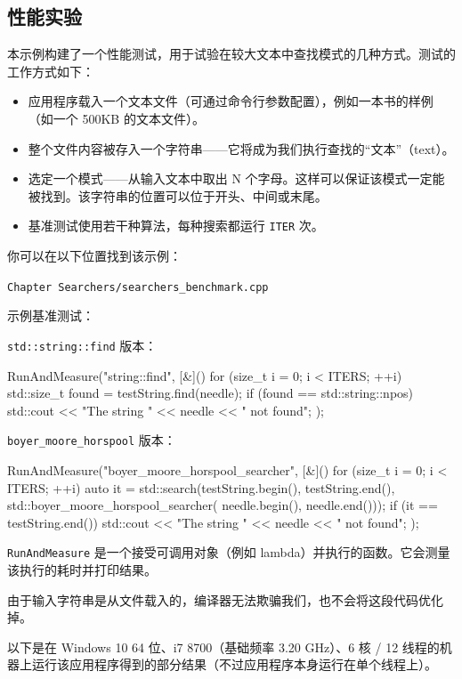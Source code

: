 \subsection{性能实验}

本示例构建了一个性能测试，用于试验在较大文本中查找模式的几种方式。测试的工作方式如下：

\begin{itemize}
\item 应用程序载入一个文本文件（可通过命令行参数配置），例如一本书的样例（如一个 500KB 的文本文件）。
\item 整个文件内容被存入一个字符串——它将成为我们执行查找的“文本”（text）。
\item 选定一个模式——从输入文本中取出 N 个字母。这样可以保证该模式一定能被找到。该字符串的位置可以位于开头、中间或末尾。
\item 基准测试使用若干种算法，每种搜索都运行 \texttt{ITER} 次。
\end{itemize}

你可以在以下位置找到该示例：

\texttt{Chapter Searchers/searchers\_benchmark.cpp}

示例基准测试：

\texttt{std::string::find} 版本：

\begin{codebox}[cpp]
RunAndMeasure("string::find", [&]() {
for (size_t i = 0; i < ITERS; ++i)
{
std::size_t found = testString.find(needle);
if (found == std::string::npos)
std::cout << "The string " << needle << " not found\n";
}
});
\end{codebox}

\texttt{boyer\_moore\_horspool} 版本：

\begin{codebox}[cpp]
RunAndMeasure("boyer_moore_horspool_searcher", [&]() {
for (size_t i = 0; i < ITERS; ++i)
{
auto it = std::search(testString.begin(), testString.end(),
std::boyer_moore_horspool_searcher(
needle.begin(), needle.end()));
if (it == testString.end())
std::cout << "The string " << needle << " not found\n";
}
});
\end{codebox}

\texttt{RunAndMeasure} 是一个接受可调用对象（例如 lambda）并执行的函数。它会测量该执行的耗时并打印结果。

由于输入字符串是从文件载入的，编译器无法欺骗我们，也不会将这段代码优化掉。

以下是在 Windows 10 64 位、i7 8700（基础频率 3.20 GHz）、6 核 / 12 线程的机器上运行该应用程序得到的部分结果（不过应用程序本身运行在单个线程上）。


